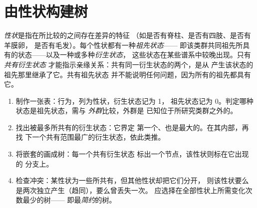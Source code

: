 \section{由性状构建树}

\begin{definition}[祖先状态与衍生状态]\label{def:g12:phylogenetic-trees:states}
\emph{性状}是指在所比较的之间存在差异的特征
（如是否有脊柱、是否有四肢、是否有羊膜卵，
是否有毛发）。每个性状都有一种\emph{祖先状态}——
即该类群共同祖先所具有的状态——以及一种或多种\emph{衍生状态}，
这些状态在某些谱系中较晚出现。只有\emph{共有衍生状态}
才能指示亲缘关系：共有同一衍生状态的两个，是从
产生该状态的祖先那里继承了它。共有祖先状态
并不能说明任何问题，因为所有的祖先都具有它。
\end{definition}

\begin{method}[由性状矩阵到树]\label{met:g12:phylogenetic-trees:build}
\begin{enumerate}
  \item 制作一张表：行为，列为性状，衍生状态记为 1，
        祖先状态记为 0。判定哪种状态是祖先状态，需与
        \emph{外群}比较，外群是
        已知位于所研究类群之外的。
  \item 找出被最多所共有的衍生状态：它界定
        第一个、也是最大的。在其内部，再找
        下一个共有范围最广的衍生状态，依此类推。
  \item 将嵌套的画成树：每一个共有衍生状态
        标出一个节点，该性状则标在它出现的
        分支上。
  \item 检查冲突：某性状为一些所共有，但其他性状却把它们分开，
        则该性状要么是两次独立产生（趋同），要么曾丢失一次。
        应选择在全部性状上所需变化次数最少的树——
        即最\emph{简约}的树。
\end{enumerate}
\end{method}

